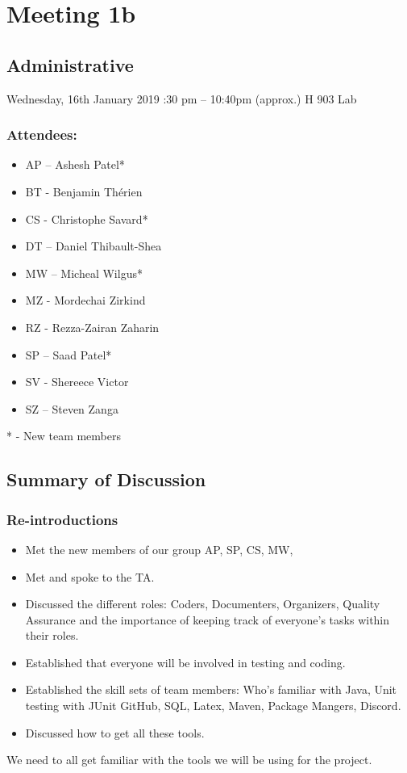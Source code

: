 \documentclass[12pt]{article}
\begin{document}
	\pagebreak
	
	\section{Meeting 1b}
	
	\subsection{Administrative}
	Wednesday, 16th January 2019 :30 pm – 10:40pm (approx.) \textbar H 903 Lab
	\subsubsection{Attendees:} 
	\begin{itemize}
		\item AP – Ashesh Patel*
		\item BT - Benjamin Th\'erien
		\item CS - Christophe Savard*
		\item DT – Daniel Thibault-Shea
		\item MW – Micheal Wilgus*  
		\item MZ - Mordechai Zirkind 
		\item RZ - Rezza-Zairan Zaharin
		\item SP – Saad Patel* 	
		\item SV - Shereece Victor
		\item SZ – Steven Zanga
	\end{itemize}
	* - New team members 
	
	
	\subsection{Summary of Discussion }
		\subsubsection{Re-introductions }
			\begin{itemize}
				\item Met the new members of our group AP, SP, CS, MW, 
				\item Met and spoke to the TA. 
				\item	Discussed the different roles: Coders, Documenters, Organizers, Quality Assurance and the importance of keeping track of everyone’s tasks within their roles. 
				\item Established that everyone will be involved in testing and coding. 
				\item Established the skill sets of team members: Who’s familiar with Java, Unit testing with JUnit GitHub, SQL, Latex, Maven, Package Mangers, Discord.
				\item Discussed how to get all these tools.
			\end{itemize}
	We need to all get familiar with the tools we will be using for the project.
	
\end{document}
